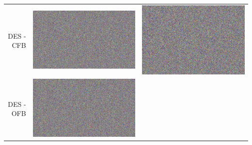 \documentclass[fleqn, journal, onecolumn]{IEEEtran}             %
\theoremstyle{break}                                            %
\begin{document}
\begin{tabular}{|r || p{5cm} | p{5cm} | }
\begin{minipage}{.2\textwidth}
      \end{minipage}    
      \\\hline
      DES - CFB  &  
      \begin{minipage}{.2\textwidth}
        \includegraphics[width=\linewidth]{1DES3}
      \end{minipage}  & 
      \begin{minipage}{.2\textwidth}
        \includegraphics[width=\linewidth]{2DES3}
      \end{minipage}    
      \\\hline
      DES - OFB  &  
      \begin{minipage}{.2\textwidth}
        \includegraphics[width=\linewidth]{1DES4}

\end{minipage}
\end{tabular}
\end{document}
